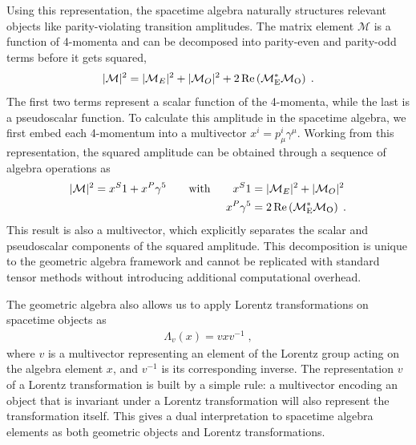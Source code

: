 \documentclass[submission, Phys]{SciPost}
\begin{document}
Using this representation, the spacetime algebra naturally structures relevant objects like parity-violating transition amplitudes. The matrix element $\mathcal{M}$ is a function of 4-momenta and can be decomposed into parity-even and parity-odd terms before it gets squared,
%
\begin{align}
    |\mathcal{M}|^2 = |\mathcal{M}_E|^2 + |\mathcal{M}_O|^2 + 2\, \rm{Re}\left(\mathcal{M}_E^* \mathcal{M}_O \right) \; .
\end{align}
%
The first two terms represent a scalar function of the 4-momenta, while the last is a pseudoscalar function. To calculate this amplitude in the spacetime algebra, we first embed each 4-momentum into a multivector $x^i = p_\mu^i \gamma^\mu$. Working from this representation, the squared amplitude can be obtained through a sequence of algebra operations as
%
\begin{align}
    |\mathcal{M}|^2 = x^S1 + x^P \gamma^5 
    \qquad \text{with} \qquad 
    x^S1 &= |\mathcal{M}_E|^2 + |\mathcal{M}_O|^2 \notag \\
    x^P \gamma^5 &= 2\, \rm{Re}\left(\mathcal{M}_E^* \mathcal{M}_O \right) \; . 
\end{align}
%
This result is also a multivector, which explicitly separates the scalar and pseudoscalar components of the squared amplitude. This decomposition is unique to the geometric algebra framework and cannot be replicated with standard tensor methods without introducing additional computational overhead.

The geometric algebra also allows us to apply Lorentz transformations on spacetime objects as 
%
\begin{align}
    \Lambda_v(x) = vxv^{-1} \; , 
    \label{eq:lorentz_law}
\end{align}
%
where $v$ is a multivector representing an element of the Lorentz group acting on the algebra element $x$, and $v^{-1}$ is its corresponding inverse. The representation $v$ of a Lorentz transformation is built by a simple rule: a multivector encoding an object that is invariant under a Lorentz transformation will also represent the transformation itself. This gives a dual interpretation to spacetime algebra elements as both geometric objects and Lorentz transformations.
\end{document}
